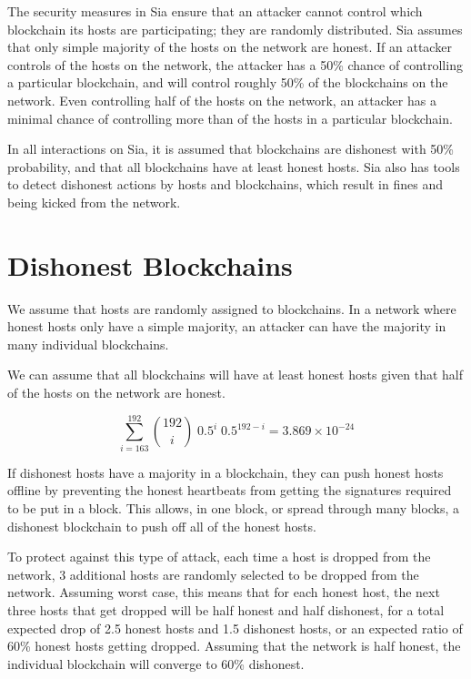 \documentclass[twocolumn]{article}
\begin{document}
The security measures in Sia ensure that an attacker cannot control which blockchain its hosts are participating; they are randomly distributed.
Sia assumes that only simple majority of the hosts on the network are honest.
If an attacker controls \fortynine{} of the hosts on the network, the attacker has a 50\% chance of controlling a particular blockchain, and will control roughly 50\% of the blockchains on the network.
Even controlling half of the hosts on the network, an attacker has a minimal chance of controlling more than \maxcorruption{} of the hosts in a particular blockchain.

In all interactions on Sia, it is assumed that blockchains are dishonest with 50\% probability, and that all blockchains have at least \inversemaxcorruption{} honest hosts.
Sia also has tools to detect dishonest actions by hosts and blockchains, which result in fines and being kicked from the network.

\section{Dishonest Blockchains}

We assume that hosts are randomly assigned to blockchains.
In a network where honest hosts only have a simple majority, an attacker can have the majority in many individual blockchains.

We can assume that all blockchains will have at least \inversemaxcorruption{} honest hosts given that half of the hosts on the network are honest.

\begin{equation}
\sum_{i=163}^{192} {192 \choose i} \; 0.5^{i} \; 0.5^{192-i} = 3.869\times10^{-24}
\end{equation}

If dishonest hosts have a majority in a blockchain, they can push honest hosts offline by preventing the honest heartbeats from getting the signatures required to be put in a block.
This allows, in one block, or spread through many blocks, a dishonest blockchain to push off all of the honest hosts.

To protect against this type of attack, each time a host is dropped from the network, 3 additional hosts are randomly selected to be dropped from the network.
Assuming worst case, this means that for each honest host, the next three hosts that get dropped will be half honest and half dishonest, for a total expected drop of 2.5 honest hosts and 1.5 dishonest hosts, or an expected ratio of 60\% honest hosts getting dropped.
Assuming that the network is half honest, the individual blockchain will converge to 60\% dishonest.
\end{document}
